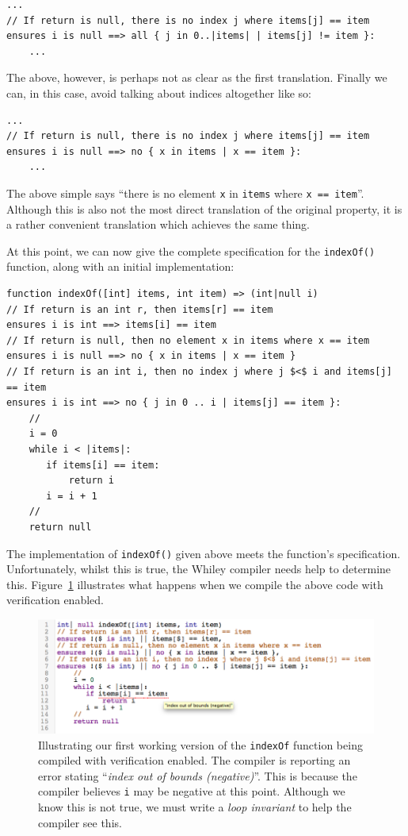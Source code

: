 \begin{lstlisting}
...
// If return is null, there is no index j where items[j] == item
ensures i is null ==> all { j in 0..|items| | items[j] != item }:
    ...
\end{lstlisting}

The above, however, is perhaps not as clear as the first translation.
Finally we can, in this case, avoid talking about indices altogether
like so:

\begin{lstlisting}
...
// If return is null, there is no index j where items[j] == item
ensures i is null ==> no { x in items | x == item }:
    ...
\end{lstlisting}

The above simple says ``there is no element \lstinline{x} in
\lstinline{items} where \lstinline{x == item}''.  Although this is
also not the most direct translation of the original property, it is a
rather convenient translation which achieves the same thing.

At this point, we can now give the complete specification for the
\lstinline{indexOf()} function, along with an initial implementation:

\begin{lstlisting}
function indexOf([int] items, int item) => (int|null i)
// If return is an int r, then items[r] == item
ensures i is int ==> items[i] == item
// If return is null, then no element x in items where x == item
ensures i is null ==> no { x in items | x == item }
// If return is an int i, then no index j where j $<$ i and items[j] == item
ensures i is int ==> no { j in 0 .. i | items[j] == item }:
    //
    i = 0
    while i < |items|:
       if items[i] == item:
           return i 
       i = i + 1
    //
    return null
\end{lstlisting}

The implementation of \lstinline{indexOf()} given above meets the
function's specification.  Unfortunately, whilst this is true, the
Whiley compiler needs help to determine this.  Figure~\ref{eg_indexOf}
illustrates what happens when we compile the above code with
verification enabled.

\begin{figure}[!t]
\centering
\includegraphics[width=1.0\textwidth]{../images/indexOf.png}
\caption{Illustrating our first working version of the
  \lstinline{indexOf} function being compiled with verification
  enabled.  The compiler is reporting an error stating ``{\em index out of
  bounds (negative)}''.  This is because the compiler believes
  \lstinline{i} may be negative at this point.  Although we know this
  is not true, we must write a {\em loop invariant} to help the
  compiler see this.}
\label{eg_indexOf}
\end{figure}

